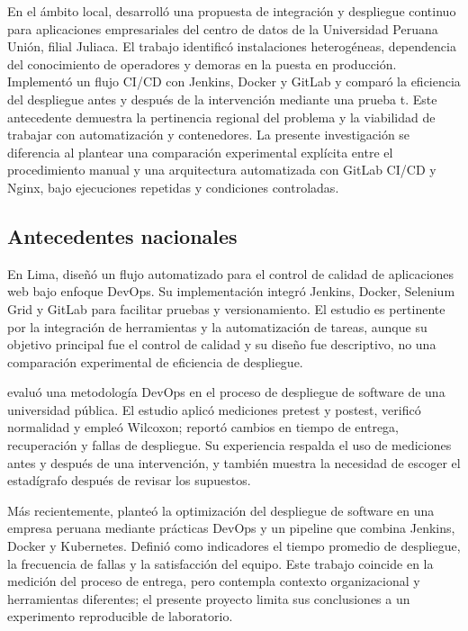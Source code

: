 \documentclass[12pt,a4paper]{article}
\begin{document}
En el ámbito local, \citet{mamanilarico2020} desarrolló una propuesta de integración y despliegue continuo para aplicaciones empresariales del centro de datos de la Universidad Peruana Unión, filial Juliaca. El trabajo identificó instalaciones heterogéneas, dependencia del conocimiento de operadores y demoras en la puesta en producción. Implementó un flujo CI/CD con Jenkins, Docker y GitLab y comparó la eficiencia del despliegue antes y después de la intervención mediante una prueba t. Este antecedente demuestra la pertinencia regional del problema y la viabilidad de trabajar con automatización y contenedores. La presente investigación se diferencia al plantear una comparación experimental explícita entre el procedimiento manual y una arquitectura automatizada con GitLab CI/CD y Nginx, bajo ejecuciones repetidas y condiciones controladas.

\subsection{Antecedentes nacionales}

En Lima, \citet{marchan2021} diseñó un flujo automatizado para el control de calidad de aplicaciones web bajo enfoque DevOps. Su implementación integró Jenkins, Docker, Selenium Grid y GitLab para facilitar pruebas y versionamiento. El estudio es pertinente por la integración de herramientas y la automatización de tareas, aunque su objetivo principal fue el control de calidad y su diseño fue descriptivo, no una comparación experimental de eficiencia de despliegue.

\citet{inqui2025} evaluó una metodología DevOps en el proceso de despliegue de software de una universidad pública. El estudio aplicó mediciones pretest y postest, verificó normalidad y empleó Wilcoxon; reportó cambios en tiempo de entrega, recuperación y fallas de despliegue. Su experiencia respalda el uso de mediciones antes y después de una intervención, y también muestra la necesidad de escoger el estadígrafo después de revisar los supuestos.

Más recientemente, \citet{mamanihuayta2025} planteó la optimización del despliegue de software en una empresa peruana mediante prácticas DevOps y un pipeline que combina Jenkins, Docker y Kubernetes. Definió como indicadores el tiempo promedio de despliegue, la frecuencia de fallas y la satisfacción del equipo. Este trabajo coincide en la medición del proceso de entrega, pero contempla contexto organizacional y herramientas diferentes; el presente proyecto limita sus conclusiones a un experimento reproducible de laboratorio.
\end{document}
